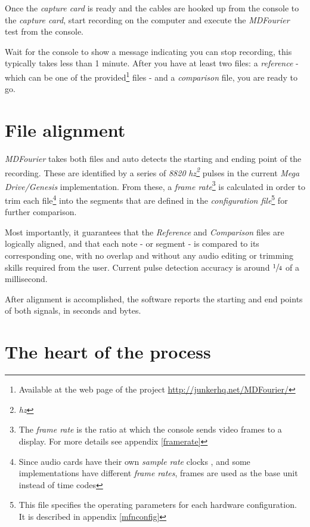 \documentclass[10pt,a4paper]{report}
\newcommand{\define}[1]{
	\textit{\acrshort{#1}\footnote{\textit{\acrlong{#1}}}}}
\begin{document}
Once the \textit{capture card} is ready and the cables are hooked up from the console to the \textit{capture card}, start recording on the computer and execute the \textit{MDFourier} test from the console.

Wait for the console to show a message indicating you can stop recording, this typically takes less than 1 minute. After you have at least two files: a \textit{reference} - which can be one of the provided\footnote{Available at the web page of the project \url{http://junkerhq.net/MDFourier/}} files -  and a \textit{comparison} file, you are ready to go. 

\section{File alignment}

\textit{MDFourier} takes both files and auto detects the starting and ending point of the recording. These are identified by a series of \textit{8820}\define{hz} pulses in the current \textit{Mega Drive/Genesis} implementation. From these, a \textit{frame rate}\footnote{The \textit{frame rate} is the ratio at which the console sends video frames to a display. For more details see appendix \ref{framerate}} is calculated in order to trim each file\footnote{Since audio cards have their own \textit{sample rate} clocks \cite{SoundCardClock} \cite{soundcardtiming} \cite{gwsoundcardtiming}, and some implementations have different \textit{frame rates}, frames are used as the base unit instead of time codes} into the segments that are defined in the \textit{configuration file}\footnote{This file specifies the operating parameters for each hardware configuration. It is described in appendix \ref{mfnconfig}} for further comparison.

Most importantly, it guarantees that the \textit{Reference} and \textit{Comparison} files are logically aligned, and that each note - or segment - is compared to its corresponding one, with no overlap and without any audio editing or trimming skills required from the user. Current pulse detection accuracy is around $\sfrac{1}{4}$ of a millisecond.

After alignment is accomplished, the software reports the starting and end points of both signals, in seconds and bytes.

\section{The heart of the process}
\end{document}
